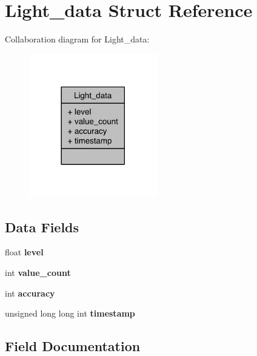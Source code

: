 \section{Light\-\_\-data Struct Reference}
\label{structLight__data}


Collaboration diagram for Light\-\_\-data\-:\nopagebreak
\begin{figure}[H]
\begin{center}
\leavevmode
\includegraphics[width=158pt]{structLight__data__coll__graph}
\end{center}
\end{figure}
\subsection*{Data Fields}
\begin{DoxyCompactItemize}
\item 
float {\bfseries level}\label{structLight__data_ab50120a5a2d60a14e2b69e14c0ce9108}

\item 
int {\bfseries value\-\_\-count}\label{structLight__data_a514e362b40ebd045f4abbc3a2e0a6bdd}

\item 
int {\bfseries accuracy}\label{structLight__data_a71b41900902193246039770ec51da22e}

\item 
unsigned long long int {\bfseries timestamp}\label{structLight__data_a9f05ffeeecc1ec05ba0b5702f008dc97}

\end{DoxyCompactItemize}


\subsection{Field Documentation}

